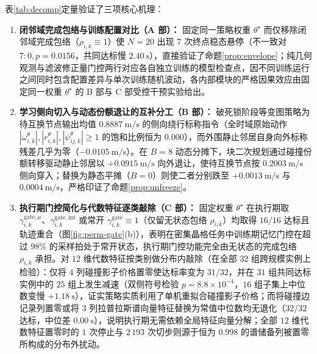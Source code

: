 表\ref{tab:decomp}定量验证了三项核心机理：
\begin{enumerate}
 \item \textbf{闭邻域完成包络与训练配置对比（A 部）：} 固定同一策略权重 $\theta^\star$ 而仅移除闭邻域完成包络（$\rho_{i,k}\equiv 1$）使 $N=20$ 出现 $7$ 次终点稳态悬停（不一致对 $7:0,p=0.0156$，共同达标慢 $2.40\ \mathrm s$），直接验证了命题\ref{prop:envelope}；纯几何观测与滤波修正量门控两行对应各自独立训练的模型检查点，因不同训练运行之间同时包含配置差异与单次训练随机波动，各内部模块的严格因果效应由固定同一权重 $\theta^\star$ 的 B 部与 C 部受控干预实验给出。
 \item \textbf{学习侧向切入与动态份额退让的互补分工（B 部）：} 破死锁阶段等变图策略为待互换节点输出均值 $0.8887\ \mathrm{m/s}$ 的侧向绕行标称指令（全时域原始动作 $|\omega_{i,k}^\theta|,|r_{i,k}^\theta|,|\psi_{ij,k}^\theta|\ge 1$ 的饱和比例恒为 $0.000$），而外围静止邻居自身向外标称残差几乎为零（$-0.0105\ \mathrm{m/s}$）。在 $B=8$ 动态分摊下，块二次规划通过碰撞份额转移驱动静止邻居以 $+0.0915\ \mathrm{m/s}$ 向外退让，使待互换节点按 $0.2003\ \mathrm{m/s}$ 侧向穿入；替换为静态平摊（$B=0$）则使二者分别跌至 $+0.0013\ \mathrm{m/s}$ 与 $0.0004\ \mathrm{m/s}$，严格印证了命题\ref{prop:unfreeze}。
 \item \textbf{执行期门控简化与代数特征逐类敲除（C 部）：} 固定权重 $\theta^\star$ 在执行期取 $\gamma_{i,k}^{\mathrm{gate},\mu}$、$\gamma_{i,k}^{\mathrm{gate,int}}$ 或常开 $\gamma_{i,k}^{\mathrm{gate}}\equiv 1$（仅留无状态包络 $\rho_{i,k}$）均取得 $16/16$ 达标且轨迹重合（图\ref{fig:perm-gate}(b)），表明在密集晶格任务中训练期记忆门控在超过 $98\%$ 的采样拍处于常开状态，执行期门控功能完全由无状态的完成包络 $\rho_{i,k}$ 承担。对 $12$ 维代数特征按类别做分布内敲除（在全部 $32$ 组跨规模实例上检验）：仅将 $4$ 列碰撞影子价格置零使达标率变为 $31/32$，并在 $31$ 组共同达标实例中的 $25$ 组上发生减速（双侧符号检验 $p=8.8\times 10^{-4}$，$16$ 组子集上中位数变慢 $+1.18\ \mathrm s$），证实策略实质利用了单机重拟合碰撞影子价格；而将碰撞边记录列置零或将 $3$ 列拉普拉斯谱向量特征替换为常值中位数均无退化（$32/32$ 达标，中位差 $0.00\ \mathrm s$），说明执行期无需依赖全局特征向量分解；全部 $12$ 维代数特征置零时的 $1$ 次停止与 $2\,193$ 次切步则源于恒为 $0.998$ 的谱储备列被置零所构成的分布外扰动。
\end{enumerate}

